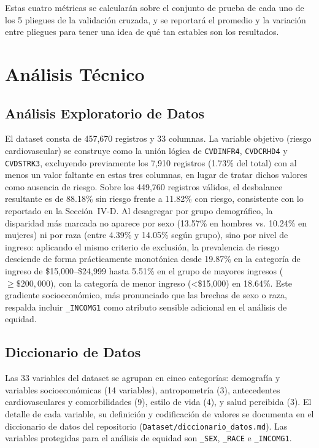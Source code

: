\documentclass[conference]{IEEEtran}
\begin{document}
Estas cuatro métricas se calcularán sobre el conjunto de prueba de cada uno de los 5 pliegues de la validación cruzada, y se reportará el promedio y la variación entre pliegues para tener una idea de qué tan estables son los resultados.

\section{Análisis Técnico}

\subsection{Análisis Exploratorio de Datos}

El dataset consta de 457,670 registros y 33 columnas. La variable objetivo (riesgo cardiovascular) se construye como la unión lógica de \texttt{CVDINFR4}, \texttt{CVDCRHD4} y \texttt{CVDSTRK3}, excluyendo previamente los 7,910 registros (1.73\% del total) con al menos un valor faltante en estas tres columnas, en lugar de tratar dichos valores como ausencia de riesgo. Sobre los 449,760 registros válidos, el desbalance resultante es de 88.18\% sin riesgo frente a 11.82\% con riesgo, consistente con lo reportado en la Sección~IV-D. Al desagregar por grupo demográfico, la disparidad más marcada no aparece por sexo (13.57\% en hombres vs. 10.24\% en mujeres) ni por raza (entre 4.39\% y 14.05\% según grupo), sino por nivel de ingreso: aplicando el mismo criterio de exclusión, la prevalencia de riesgo desciende de forma prácticamente monotónica desde 19.87\% en la categoría de ingreso de \$15,000--\$24,999 hasta 5.51\% en el grupo de mayores ingresos (\(\geq \$200,000\)), con la categoría de menor ingreso (<\$15,000) en 18.64\%. Este gradiente socioeconómico, más pronunciado que las brechas de sexo o raza, respalda incluir \texttt{\_INCOMG1} como atributo sensible adicional en el análisis de equidad.

\subsection{Diccionario de Datos}
Las 33 variables del dataset se agrupan en cinco categorías: demografía y variables socioeconómicas (14 variables), antropometría (3), antecedentes cardiovasculares y comorbilidades (9), estilo de vida (4), y salud percibida (3). El detalle de cada variable, su definición y codificación de valores se documenta en el diccionario de datos del repositorio (\texttt{Dataset/diccionario\_datos.md}). Las variables protegidas para el análisis de equidad son \texttt{\_SEX}, \texttt{\_RACE} e \texttt{\_INCOMG1}.
\end{document}
